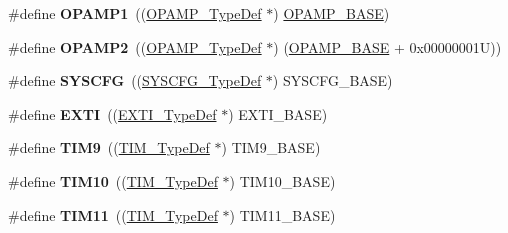 \begin{DoxyCompactItemize}
\item 
\hypertarget{group___peripheral__declaration_gaf0025add8d004b4f4bf6eaeedd55c488}{\#define {\bfseries O\-P\-A\-M\-P1}~((\hyperlink{struct_o_p_a_m_p___type_def}{O\-P\-A\-M\-P\-\_\-\-Type\-Def} $\ast$) \hyperlink{group___peripheral__memory__map_ga6e9722d15c7ed794f0eca9682f64c03c}{O\-P\-A\-M\-P\-\_\-\-B\-A\-S\-E})}\label{group___peripheral__declaration_gaf0025add8d004b4f4bf6eaeedd55c488}

\item 
\hypertarget{group___peripheral__declaration_gabc11c296d6d15ca861b6378bc056848e}{\#define {\bfseries O\-P\-A\-M\-P2}~((\hyperlink{struct_o_p_a_m_p___type_def}{O\-P\-A\-M\-P\-\_\-\-Type\-Def} $\ast$) (\hyperlink{group___peripheral__memory__map_ga6e9722d15c7ed794f0eca9682f64c03c}{O\-P\-A\-M\-P\-\_\-\-B\-A\-S\-E} + 0x00000001\-U))}\label{group___peripheral__declaration_gabc11c296d6d15ca861b6378bc056848e}

\item 
\hypertarget{group___peripheral__declaration_ga3c833fe1c486cb62250ccbca32899cb8}{\#define {\bfseries S\-Y\-S\-C\-F\-G}~((\hyperlink{struct_s_y_s_c_f_g___type_def}{S\-Y\-S\-C\-F\-G\-\_\-\-Type\-Def} $\ast$) S\-Y\-S\-C\-F\-G\-\_\-\-B\-A\-S\-E)}\label{group___peripheral__declaration_ga3c833fe1c486cb62250ccbca32899cb8}

\item 
\hypertarget{group___peripheral__declaration_ga9189e770cd9b63dadd36683eb9843cac}{\#define {\bfseries E\-X\-T\-I}~((\hyperlink{struct_e_x_t_i___type_def}{E\-X\-T\-I\-\_\-\-Type\-Def} $\ast$) E\-X\-T\-I\-\_\-\-B\-A\-S\-E)}\label{group___peripheral__declaration_ga9189e770cd9b63dadd36683eb9843cac}

\item 
\hypertarget{group___peripheral__declaration_gaf52b4b4c36110a0addfa98059f54a50e}{\#define {\bfseries T\-I\-M9}~((\hyperlink{struct_t_i_m___type_def}{T\-I\-M\-\_\-\-Type\-Def} $\ast$) T\-I\-M9\-\_\-\-B\-A\-S\-E)}\label{group___peripheral__declaration_gaf52b4b4c36110a0addfa98059f54a50e}

\item 
\hypertarget{group___peripheral__declaration_ga46b2ad3f5f506f0f8df0d2ec3e767267}{\#define {\bfseries T\-I\-M10}~((\hyperlink{struct_t_i_m___type_def}{T\-I\-M\-\_\-\-Type\-Def} $\ast$) T\-I\-M10\-\_\-\-B\-A\-S\-E)}\label{group___peripheral__declaration_ga46b2ad3f5f506f0f8df0d2ec3e767267}

\item 
\hypertarget{group___peripheral__declaration_gacfd11ef966c7165f57e2cebe0abc71ad}{\#define {\bfseries T\-I\-M11}~((\hyperlink{struct_t_i_m___type_def}{T\-I\-M\-\_\-\-Type\-Def} $\ast$) T\-I\-M11\-\_\-\-B\-A\-S\-E)}\label{group___peripheral__declaration_gacfd11ef966c7165f57e2cebe0abc71ad}


\end{DoxyCompactItemize}

